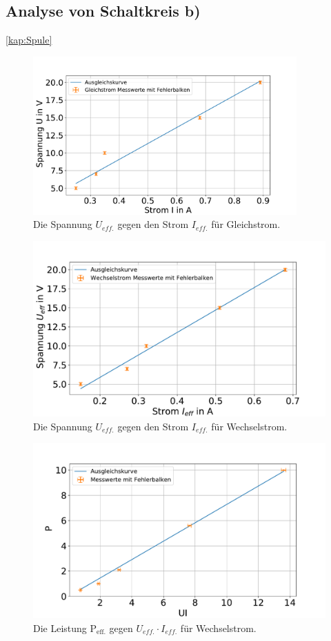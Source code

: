\subsection{Analyse von Schaltkreis b)}\ref{kap:Spule}
\begin{figure}[h]
	\centering
	\includegraphics[width=0.9\textwidth]{res/UgegenI_GL.pdf}
	\caption{Die Spannung $U_{eff.}$ gegen den Strom $I_{eff.}$ für Gleichstrom.}
	\label{fig:UgegenIgl}
\end{figure}
\begin{figure}[h]
	\centering
	\includegraphics[width=0.9\linewidth]{res/UgegenI_W.pdf}
	\caption{Die Spannung $U_{eff.}$ gegen den Strom $I_{eff.}$ für Wechselstrom.}
	\label{fig:UgegenIw}
\end{figure}
\begin{figure}[h]
	\centering
	\includegraphics[width=0.9\linewidth]{res/PgegenUI.pdf}
	\caption{Die Leistung P$_\text{eff.}$ gegen $U_{eff.} \cdot I_{eff.}$ für Wechselstrom.}
	\label{fig:PgegenUI}
\end{figure}
